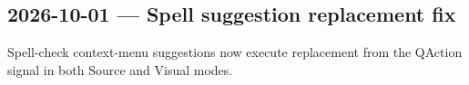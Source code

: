 \documentclass[a4paper]{article}
\begin{document}
\begin{preview}
\section*{2026-10-01 --- Spell suggestion replacement fix}
Spell-check context-menu suggestions now execute replacement from the QAction signal in both Source and Visual modes.
\end{preview}
\end{document}
